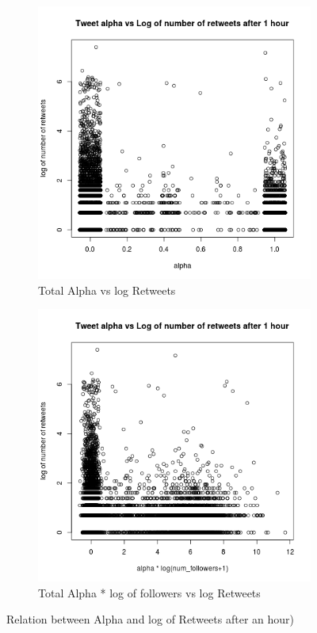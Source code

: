  \begin{figure}
   \centering
  \begin{subfigure}[b]{0.45\textwidth}
    \includegraphics[width=\textwidth]{../src/Analysis/alphadist.png}
    \caption{Total Alpha vs log Retweets}
    \label{fig:gull}
  \end{subfigure}%
  \begin{subfigure}[b]{0.45\textwidth}
    \includegraphics[width=\textwidth]{../src/Analysis/alphalognfdist.png}
    \caption{Total Alpha * log of followers vs log Retweets}
    \label{fig:mouse}
  \end{subfigure}
  \caption{Relation between Alpha and log of Retweets after an hour)}\label{fig:animals}
\end{figure}

